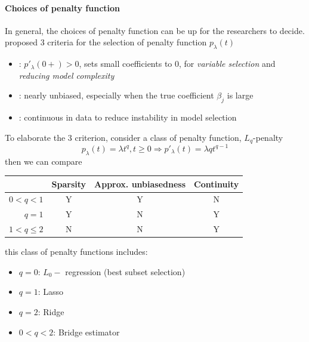 \documentclass[twoside]{article}
\begin{document}
\paragraph*{Choices of penalty function} In general, the choices of penalty function can be up for the researchers to decide. \citet{fan2001variable} proposed 3 criteria for the selection of penalty function $p_\lambda(t)$
\begin{itemize}
    \item {}: $p'_{\lambda}(0+)>0$, sets small coefficients to 0, for \textit{variable selection} and \textit{reducing model complexity}
    \item {}: nearly unbiased, especially when the true coefficient $\beta_j$ is large
    \item {}: continuous in data to reduce instability in model selection
\end{itemize}
To elaborate the 3 criterion, consider a class of penalty function, $L_q$-penalty 
$$
p_{\lambda}(t) = \lambda t^q, t\geq 0 \Rightarrow p'_{\lambda}(t) = \lambda qt^{q-1}
$$
then we can compare
\begin{center}
    \begin{tabular}{ r|ccc } 
        & Sparsity & Approx. unbiasedness & Continuity \\
     \hline
     $0<q<1$ & Y & Y & N \\
     $q=1$ & Y & N & Y \\
     $1<q\leq 2$ & N & N & Y \\
     \hline
    \end{tabular}
\end{center}
this class of penalty functions includes:
\begin{itemize}
    \item $q=0$: $L_0-$ regression (best subset selection)
    \item $q=1$: Lasso
    \item $q=2$: Ridge
    \item $0<q<2$: Bridge estimator
\end{itemize}
\end{document}
